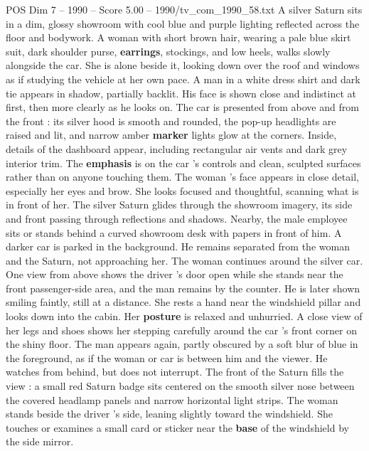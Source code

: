 \begin{textsample}{POS Dim 7 – 1990 – Score 5.00 – 1990/tv\_com\_1990\_58.txt}  \label{ex:f7_pos_069}
A silver Saturn sits in a dim, glossy showroom with cool blue and purple lighting reflected across the floor and bodywork.
A woman with short brown hair, wearing a pale blue skirt suit, dark shoulder purse, \textbf{earrings}, stockings, and low heels, walks slowly alongside the car.
She is alone beside it, looking down over the roof and windows as if studying the vehicle at her own pace.
A man in a white dress shirt and dark tie appears in shadow, partially backlit.
His face is shown close and indistinct at first, then more clearly as he looks on.
The car is presented from above and from the front : its silver hood is smooth and rounded, the pop-up headlights are raised and lit, and narrow amber \textbf{marker} lights glow at the corners.
Inside, details of the dashboard appear, including rectangular air vents and dark grey interior trim.
The \textbf{emphasis} is on the car ’s controls and clean, sculpted surfaces rather than on anyone touching them.
The woman ’s face appears in close detail, especially her eyes and brow.
She looks focused and thoughtful, scanning what is in front of her.
The silver Saturn glides through the showroom imagery, its side and front passing through reflections and shadows.
Nearby, the male employee sits or stands behind a curved showroom desk with papers in front of him.
A darker car is parked in the background.
He remains separated from the woman and the Saturn, not approaching her.
The woman continues around the silver car.
One view from above shows the driver ’s door open while she stands near the front passenger-side area, and the man remains by the counter.
He is later shown smiling faintly, still at a distance.
She rests a hand near the windshield pillar and looks down into the cabin.
Her \textbf{posture} is relaxed and unhurried.
A close view of her legs and shoes shows her stepping carefully around the car ’s front corner on the shiny floor.
The man appears again, partly obscured by a soft blur of blue in the foreground, as if the woman or car is between him and the viewer.
He watches from behind, but does not interrupt.
The front of the Saturn fills the view : a small red Saturn badge sits centered on the smooth silver nose between the covered headlamp panels and narrow horizontal light strips.
The woman stands beside the driver ’s side, leaning slightly toward the windshield.
She touches or examines a small card or sticker near the \textbf{base} of the windshield by the side mirror.

\end{textsample}
